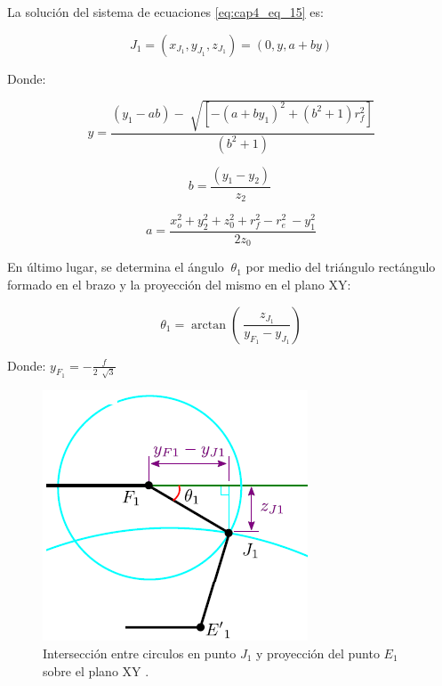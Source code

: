 La solución del sistema de ecuaciones \ref{eq:cap4_eq_15} es:

    \begin{equation}
    J_{1}= \left( x_{J_{1}},y_{J_{1}},z_{J_{1}} \right) = \left( 0,y,a+by \right)
    \label{eq:cap4_eq_16}
    \end{equation}

    Donde:

    \begin{equation}
        y=\frac{\left( y_{1}-ab \right) -\sqrt[]{ \left[  -\left( a+by_{1} \right) ^{2}+ \left( b^{2}+1 \right) r_{f}^{2} \right] }}{ \left( b^{2}+1 \right) }
    \label{eq:cap4_eq_17}
    \end{equation}

    \begin{equation}
        b=\frac{ \left( y_{1}-y_{2} \right) }{z_{2}}~ 
    \label{eq:cap4_eq_18}
    \end{equation}
    
    \begin{equation}
        a= \frac{x_{o}^{2}+y_{2}^{2}+z_{0}^{2}+r_{f}^{2}- r_{e}^{2}~-y_{1}^{2}}{2z_{0}} 
    \label{eq:cap4_eq_19}
    \end{equation}

                \newpage

En último lugar, se determina el ángulo \( ~ \theta _{1} \)  por medio del triángulo rectángulo formado en el brazo y la proyección del mismo en el plano XY:

    \begin{equation}
        \theta _{1}=\arctan  \left( ~\frac{z_{J_{1}}}{y_{F_{1}}-y_{J_{1}}} \right)  
        \label{eq:cap4_eq_20}
    \end{equation}
    
    Donde:  \( y_{F_{1}}= - \frac{f}{2~\sqrt[]{3}} \)

    
        \begin{figure}[htb]
             \centering
             \includegraphics[width=0.37\linewidth]{Main/Chapter4/Images4/DIBUJO4.png}
              \caption{Intersección entre circulos en punto $J_1$ y proyección del punto $E_1$ sobre el plano XY  \cite{Diseno_e_implementacion_de_un_sistema_de_control_para_la_representacion_grafica_a_partir_de_imagenes}.}
              \label{f:Cap4_Metodo_A_Modelacion_Cinematica_Posicion_5}
        \end{figure}


